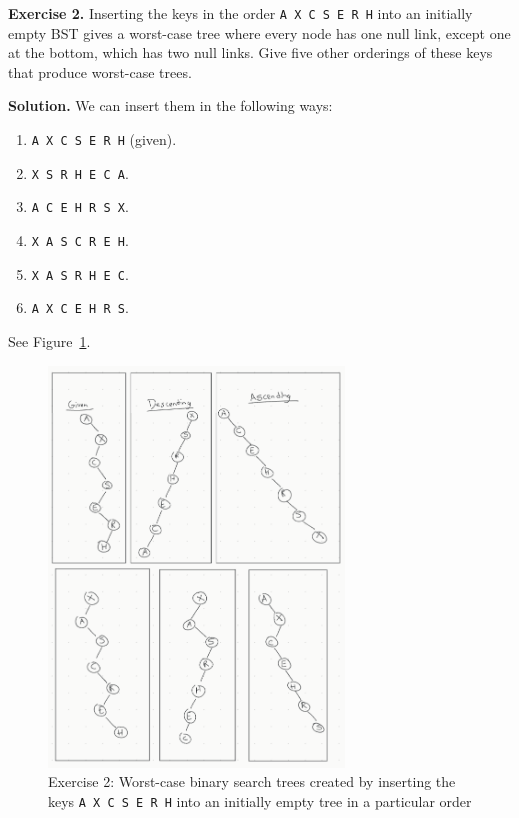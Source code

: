 \documentclass[12pt, a4paper]{article}
\newenvironment{ex}[2][Exercise]
{\par\medskip\noindent \textbf{#1 #2.}}
{\medskip}
\newenvironment{sol}[1][Solution]
{\par\medskip\noindent \textbf{#1.} }
{\medskip}
\begin{document}
	\begin{ex}{2}
		Inserting the keys in the order \texttt{A X C S E R H} into an initially empty BST
		gives a worst-case tree where every node has one null link, except one at the bottom,
		which has two null links. Give five other orderings of these keys that produce
		worst-case trees. 
	\end{ex}
	\begin{sol}
		We can insert them in the following ways:
		\begin{enumerate}[label=(\roman*)]
			\item \texttt{A X C S E R H} (given).
			\item \texttt{X S R H E C A}.
			\item \texttt{A C E H R S X}.
			\item \texttt{X A S C R E H}.
			\item \texttt{X A S R H E C}.
			\item \texttt{A X C E H R S}.
		\end{enumerate}
		See Figure~\ref{fig:ex-02}.
		\begin{figure}
			\centering
			\includegraphics[width=0.7\textwidth]{exercise-02}
			\caption{Exercise 2: Worst-case binary search trees created by inserting the
			keys \texttt{A X C S E R H} into an initially empty tree in a particular order}
			\label{fig:ex-02}
		\end{figure}
	\end{sol}
\end{document}
